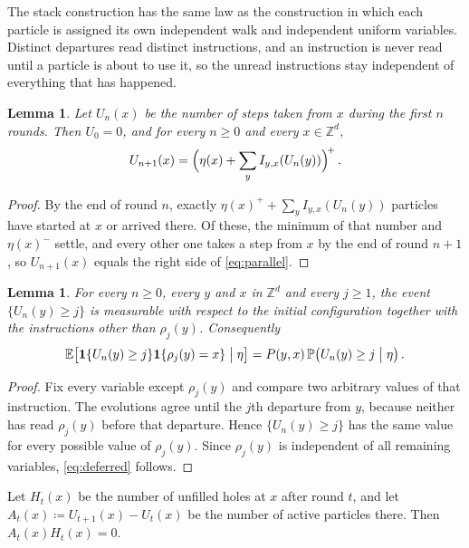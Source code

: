 \documentclass[11pt]{amsart}
\theoremstyle{plain}
\newtheorem{lemma}[theorem]{Lemma}
\theoremstyle{definition}
\newcommand{\Z}{\mathbb{Z}}
\newcommand{\E}{\mathbb{E}}
\renewcommand{\P}{\mathbb{P}}
\newcommand{\one}{\mathbf{1}}
\begin{document}
The stack construction has the same law as the construction in which each particle is assigned its own independent walk and independent uniform variables. Distinct departures read distinct instructions, and an instruction is never read until a particle is about to use it, so the unread instructions stay independent of everything that has happened.

\begin{lemma}\label{lem:parallel}
	Let $U_n(x)$ be the number of steps taken from $x$ during the first $n$
	rounds. Then $U_0=0$, and for every $n\geq0$ and every $x\in\Z^d$,
	\begin{equation}\label{eq:parallel}
		U_{n+1}(x)=\Bigl(\eta(x)+\sum_yI_{y,x}(U_n(y))\Bigr)^{\!+}\,.
	\end{equation}
\end{lemma}

\begin{proof}
	By the end of round $n$, exactly $\eta(x)^+ +\sum_yI_{y,x}(U_n(y))$ particles have started at $x$ or arrived there. Of these, the minimum of that number and $\eta(x)^-$ settle, and every other one takes a step from $x$ by the end of round $n+1$, so $U_{n+1}(x)$ equals the right side of \eqref{eq:parallel}.
\end{proof}

\begin{lemma}\label{lem:deferred}
	For every $n\geq0$, every $y$ and $x$ in $\Z^d$ and every $j\geq1$, the event
	$\{U_n(y)\geq j\}$ is measurable with respect to the initial configuration
	together with the instructions other than $\rho_j(y)$. Consequently
	\begin{equation}\label{eq:deferred}
		\E\bigl[\one\{U_n(y)\geq j\}\one\{\rho_j(y)=x\}\bigm|\eta\bigr]
		=P(y,x)\,\P\bigl(U_n(y)\geq j\bigm|\eta\bigr)\,.
	\end{equation}
\end{lemma}

\begin{proof}
	Fix every variable except $\rho_j(y)$ and compare two arbitrary values of
	that instruction. The evolutions agree until the $j$th departure from $y$,
	because neither has read $\rho_j(y)$ before that departure. Hence
	$\{U_n(y)\geq j\}$ has the same value for every possible value of
	$\rho_j(y)$. Since $\rho_j(y)$ is independent of all remaining variables,
	\eqref{eq:deferred} follows.
\end{proof}

Let $H_t(x)$ be the number of unfilled holes at $x$ after round $t$, and let
$A_t(x)\coloneqq U_{t+1}(x)-U_t(x)$ be the number of active particles there.
Then $A_t(x)H_t(x)=0$.
\end{document}
